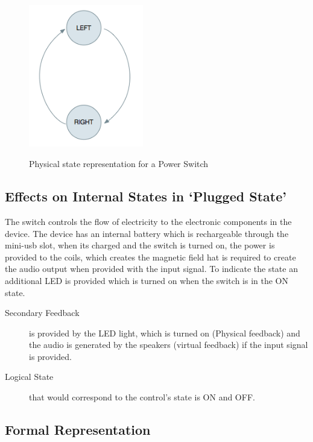 \documentclass[10pt,a4paper]{article}
\begin{document}
\begin{figure}[hbpt]
\centerline{\includegraphics[width=5cm,height=7cm,keepaspectratio]{PW1}}
\caption{Physical state representation for a Power Switch}
\label{physical_state_power_switch}
\end{figure}


\subsection{Effects on Internal States in `Plugged State'}


The switch controls the flow of electricity to the electronic components in the device. The device has an internal battery which is rechargeable through the mini-usb slot, when its charged and the switch is turned on, the power is provided to the coils, which creates the magnetic field hat is required to create the audio output when provided with the input signal. To indicate the state an additional LED is provided which is turned on when the switch is in the ON state.

\begin{description}

\item [Secondary Feedback] is provided by the LED light, which is turned on (Physical feedback) and the audio is generated by the speakers (virtual feedback) if the input signal is provided.
\item [Logical State] that would correspond to the control's state is ON and OFF.

\end{description}

\subsection{Formal Representation}
\end{document}

